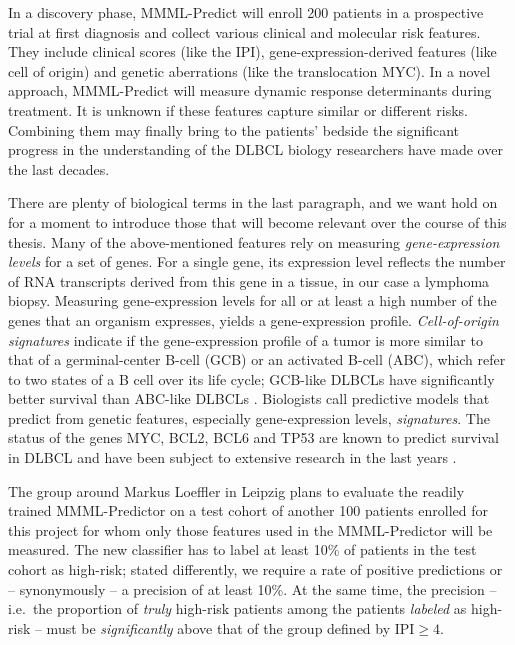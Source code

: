 In a discovery phase, MMML-Predict will enroll \num{200} patients in a prospective trial at first 
diagnosis and collect various clinical and molecular risk features.
They include clinical scores (like the IPI), gene-expression-derived features (like cell of origin) 
and genetic aberrations (like the translocation MYC). 
In a novel approach, MMML-Predict will measure dynamic response determinants during treatment. It is 
unknown if these features capture similar or different 
risks. Combining them may finally bring to the patients' bedside the significant progress in the 
understanding of the DLBCL biology researchers have made over the last decades.

There are plenty of biological terms in the last paragraph, and we want hold on for a moment to 
introduce those that will become relevant over the course of this thesis.
Many of the above-mentioned features rely on measuring \textit{gene-expression levels} for a set 
of genes. 
For a single gene, its expression level reflects the number of RNA transcripts derived from 
this gene in a tissue, in our case a lymphoma biopsy. Measuring gene-expression levels for all 
or at least a high number of the genes that an organism expresses, yields a gene-expression 
profile. \textit{Cell-of-origin signatures} indicate if the gene-expression profile 
of a tumor is more similar to that of a germinal-center B-cell (GCB) or an activated B-cell (ABC), 
which refer to two states of a B cell over its life cycle; GCB-like DLBCLs have 
significantly better survival than ABC-like DLBCLs \cite{abc-gcb00}.
Biologists call predictive models that 
predict from genetic features, especially gene-expression levels, \textit{signatures}. The status 
of the genes MYC, BCL2, BCL6 and TP53 are known to predict survival in DLBCL and have been subject 
to extensive research in the last years
\cite{hummel06, zenz17, aukema11, horn13, johnson09, klapper08, kretzmer15, rosenwald19}.

The group around Markus Loeffler in Leipzig plans to evaluate the readily trained MMML-Predictor on 
a test cohort of another \num{100} patients enrolled for this project for whom only those features 
used in the MMML-Predictor will be measured. The new classifier has to label at least \num{10}\% of 
patients in the test cohort as high-risk; stated differently, we require a rate of positive 
predictions or -- synonymously -- a precision of at least \num{10}\%. At the same time, the 
precision -- i.e.\ the proportion of \textit{truly} high-risk patients among the patients 
\textit{labeled} as high-risk -- must be \textit{significantly} above that of the group defined by
$\text{IPI} \geq 4$. 

